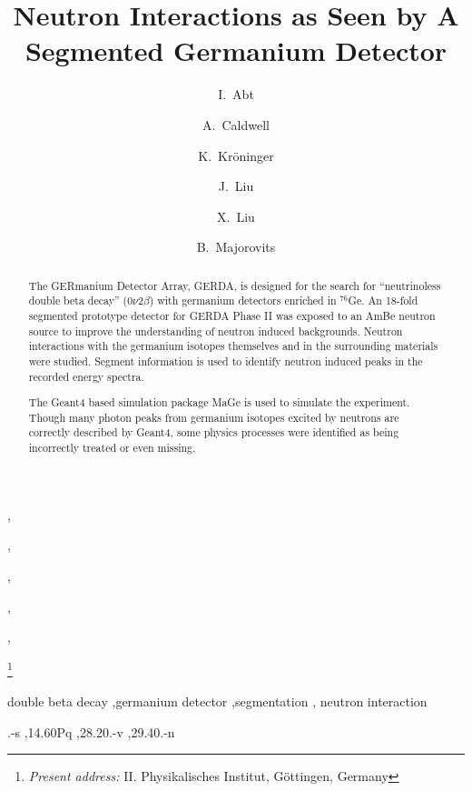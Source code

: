 \documentclass{elsart}
\begin{document}
\begin{frontmatter}



  \title{Neutron Interactions as Seen by A Segmented Germanium Detector}


  \author{I.~Abt},
  \author{A.~Caldwell},
  \author{K.~Kr\"oninger},
  \author{J.~Liu},
  \author{X.~Liu},
  \author{B.~Majorovits}

  \address{Max-Planck-Institut f\"ur Physik, M\"unchen, Germany}


  \thanks[goet]{\textit{Present address:} II. Physikalisches
    Institut, G\"ottingen, Germany}

  \begin{abstract}
    The GERmanium Detector Array, GERDA, is designed for the search
    for ``neutrinoless double beta decay'' (0$\nu$2$\beta$) with
    germanium detectors enriched in $^{76}$Ge. An 18-fold segmented
    prototype detector for GERDA Phase II was exposed to an AmBe
    neutron source to improve the understanding of neutron induced
    backgrounds. Neutron interactions with the germanium isotopes
    themselves and in the surrounding materials were studied. Segment
    information is used to identify neutron induced peaks in the
    recorded energy spectra.

    The Geant4 based simulation package MaGe is used to simulate the
    experiment. Though many photon peaks from germanium isotopes
    excited by neutrons are correctly described by Geant4, some
    physics processes were identified as being incorrectly treated or
    even missing.
  \end{abstract}

  \begin{keyword}

    double beta decay \sep germanium detector \sep segmentation \sep
    neutron interaction


    .-s \sep 14.60Pq \sep 28.20.-v \sep 29.40.-n
  \end{keyword}
\end{frontmatter}
\end{document}
